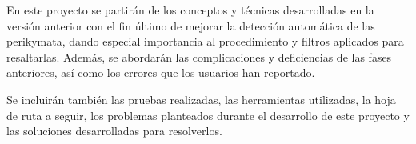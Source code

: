 En este proyecto se partirán de los conceptos y técnicas desarrolladas en la versión anterior \cite{perikymataV1} con el fin último de mejorar la detección automática de las perikymata, dando especial importancia al procedimiento y filtros aplicados para resaltarlas. Además, se abordarán las complicaciones y deficiencias de las fases anteriores, así como los errores que los usuarios han reportado.

Se incluirán también las pruebas realizadas, las herramientas utilizadas, la hoja de ruta a seguir, los problemas planteados durante el desarrollo de este proyecto y las soluciones desarrolladas para resolverlos.